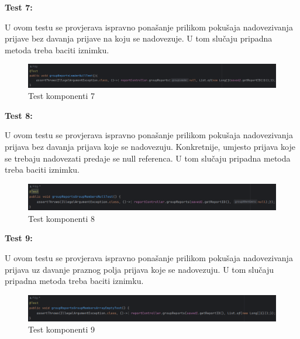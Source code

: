 			\textbf{Test 7:}
			
			U ovom testu se provjerava ispravno ponašanje prilikom pokušaja nadovezivanja prijave bez davanja prijave na koju se nadovezuje. U tom slučaju pripadna metoda treba baciti iznimku.
			
			\begin{figure}[H]
				\includegraphics[width=\textwidth]{slike/JUnitTest7.png} %
				\caption{Test komponenti 7}
				\label{fig:JUnitTest7} %
			\end{figure}
			
			\textbf{Test 8:}
			
			U ovom testu se provjerava ispravno ponašanje prilikom pokušaja nadovezivanja prijava bez davanja prijava koje se nadovezuju. Konkretnije, umjesto prijava koje se trebaju nadovezati predaje se null referenca. U tom slučaju pripadna metoda treba baciti iznimku.
			
			\begin{figure}[H]
				\includegraphics[width=\textwidth]{slike/JUnitTest8.png} %
				\caption{Test komponenti 8}
				\label{fig:JUnitTest8} %
			\end{figure}
			
			\textbf{Test 9:}
			
			U ovom testu se provjerava ispravno ponašanje prilikom pokušaja nadovezivanja prijava uz davanje praznog polja prijava koje se nadovezuju. U tom slučaju pripadna metoda treba baciti iznimku.
			
			\begin{figure}[H]
				\includegraphics[width=\textwidth]{slike/JUnitTest9.png} %
				\caption{Test komponenti 9}
				\label{fig:JUnitTest9} %
			\end{figure}
			
